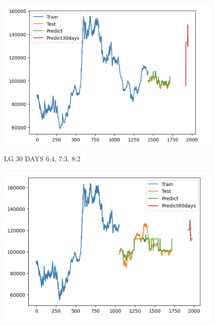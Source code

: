 \documentclass{article}
\begin{document}
\begin{multicols}{2}
\begin{figure}[H]
\begin{minipage}{0.15\textwidth}
    \label{fig:2}
    \end{minipage}%
    \begin{minipage}{0.15\textwidth}
    \centering
    \includegraphics[width=1\textwidth]{Image/Light GBM/LG_8_2_30.png}

    \label{fig:3}
    \end{minipage}
    \caption{LG 30 DAYS  6:4, 7:3, 8:2 }
\end{figure}

\begin{figure}[H]
    \centering
    \begin{minipage}{0.15\textwidth}
    \centering
    \includegraphics[width=1\textwidth]{Image/Light GBM/LG_6_4_60.png}
   

\end{minipage}
\end{figure}
\end{multicols}
\end{document}

